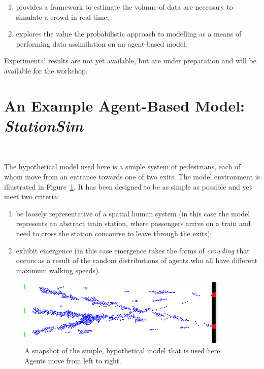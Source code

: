 \documentclass[runningheads]{llncs}
\begin{document}
\begin{enumerate}
	\item provides a framework to estimate the volume of data are necessary to simulate a crowd in real-time;
	\item explores the value the probabilistic approach to modelling as a means of performing data assimilation on an agent-based model.
\end{enumerate}

Experimental results are not yet available, but are under preparation and will be available for the workshop.



%
%
%
%
\section{An Example Agent-Based Model: \textit{StationSim}}

$ $ %

The hypothetical model used here is a simple system of pedestrians, each of whom move from an entrance towards one of two exits. The model environment is illustrated in Figure~\ref{fig:pedestrian_model_environment}. It has been designed to be as simple as possible and yet meet two criteria:

\begin{enumerate}
	\item be loosely representative of a spatial human system (in this case the model represents an abstract train station, where passengers arrive on a train and need to cross the station concourse to leave through the exits);
	\item exhibit emergence (in this case emergence takes the forms of \textit{crowding} that occurs as a result of the random distributions of agents who all have different maximum walking speeds).
\end{enumerate}

\begin{figure}
	\centering
	\includegraphics[width=0.9\textwidth]{figures/pedestrian_model_environment2}
	\caption{A snapshot of the simple, hypothetical model that is used here. Agents move from left to right.} \label{fig:pedestrian_model_environment}
\end{figure}
\end{document}
